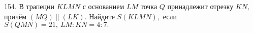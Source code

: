 154. В трапеции $KLMN$ с основанием $LM$ точка $Q$ принадлежит отрезку $KN,$ причём $(MQ)\parallel(LK).$ Найдите $S(KLMN),$ если $S(QMN)=21,\ LM:KN=4:7.$\\
